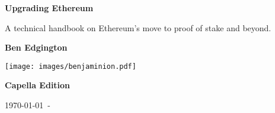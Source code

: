 \begin{titlepage}

   \begin{center}

     \vspace*{1.0cm}

     \Huge

     \textbf{Upgrading Ethereum}

     \vfill

     \Large

     A technical handbook on Ethereum's move to proof of stake and beyond.

     \vfill

     \textbf{Ben Edgington}

     \vfill

     \texttt{[image: images/benjaminion.pdf]}

     \vfill

     \textbf{Capella Edition}

     \vfill

     \normalsize

     \today\ - \href{https://github.com/benjaminion/upgrading-ethereum-book}{\texttt{}}

   \end{center}
   \restoregeometry
\end{titlepage}
